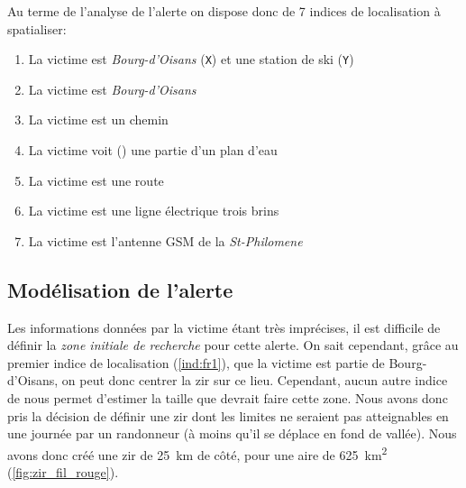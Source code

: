 Au terme de l'analyse de l'alerte on dispose donc de 7 indices de
localisation à spatialiser:
% 
\begin{enumerate}
\item \label{ind:fr1} La victime est
  \emph{Bourg-d'Oisans} (\texttt{X}) et une station de ski
  (\texttt{Y})
\item \label{ind:fr2} La victime est
   \emph{Bourg-d'Oisans} 
\item \label{ind:fr3} La victime est  un
  chemin
\item \label{ind:fr4} La victime voit ()
  une partie d'un plan d'eau
\item \label{ind:fr5} La victime est  une
  route
\item \label{ind:fr6} La victime est  une
  ligne électrique trois brins
\item \label{ind:fr7} La victime est 
  l'antenne GSM de la \emph{St-Philomene}
\end{enumerate}

\subsection{Modélisation de l'alerte}
\label{subsec:9-4-2}


Les informations données par la victime étant très imprécises, il est
difficile de définir la \emph{zone initiale de recherche} pour cette
alerte. On sait cependant, grâce au premier indice de localisation
(\ref{ind:fr1}), que la victime est partie de Bourg-d'Oisans, on peut
donc centrer la \ac{zir} sur ce lieu. Cependant, aucun autre indice de
nous permet d'estimer la taille que devrait faire cette zone. Nous
avons donc pris la décision de définir une \ac{zir} dont les limites
ne seraient pas atteignables en une journée par un randonneur (à moins
qu'il se déplace en fond de vallée).
%
Nous avons donc créé une \ac{zir} de \SI{25}{\kilo\meter} de côté,
pour une aire de \SI{625}{\kilo\meter\squared}
(\autoref{fig:zir_fil_rouge}).

